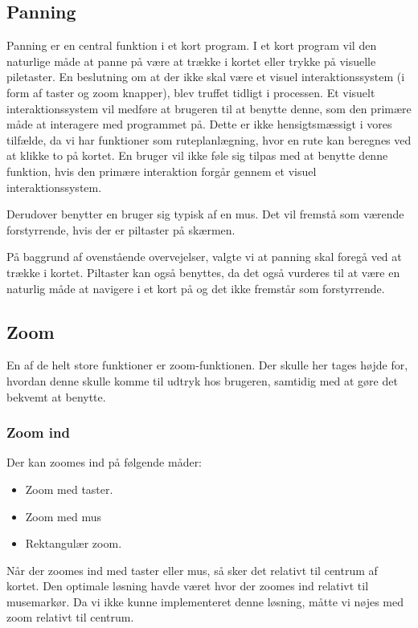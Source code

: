 \subsection{Panning}

Panning er en central funktion i et kort program. I et kort program vil den naturlige måde at panne på være at trække i kortet eller trykke på visuelle piletaster. En beslutning om at der ikke skal være et visuel interaktionssystem (i form af taster og zoom knapper), blev truffet tidligt i processen. Et visuelt interaktionssystem vil medføre at brugeren til at benytte denne, som den primære måde at interagere med programmet på. Dette er ikke hensigtsmæssigt i vores tilfælde, da vi har funktioner som ruteplanlægning, hvor en rute kan beregnes ved at klikke to på kortet. En bruger vil ikke føle sig tilpas med at benytte denne funktion, hvis den primære interaktion forgår gennem et visuel interaktionssystem. 

Derudover benytter en bruger sig typisk af en mus. Det vil fremstå som værende forstyrrende, hvis der er piltaster på skærmen.  

På baggrund af ovenstående overvejelser, valgte vi at panning skal foregå ved at trække i kortet. Piltaster kan også benyttes, da det også vurderes til at være en naturlig måde at navigere i et kort på og det ikke fremstår som forstyrrende. 


\subsection{Zoom}
En af de helt store funktioner er zoom-funktionen. Der skulle her tages højde for, hvordan denne skulle komme til udtryk hos brugeren, samtidig med at gøre det bekvemt at benytte.  

\subsubsection{Zoom ind}

Der kan zoomes ind på følgende måder:

\begin{itemize}
	\item Zoom med taster.
	\item Zoom med mus
	\item Rektangulær zoom.
\end{itemize}

Når der zoomes ind med taster eller mus, så sker det relativt til centrum af kortet. Den optimale løsning havde været hvor der zoomes ind relativt til musemarkør. Da vi ikke kunne implementeret denne løsning, måtte vi nøjes med zoom relativt til centrum.

